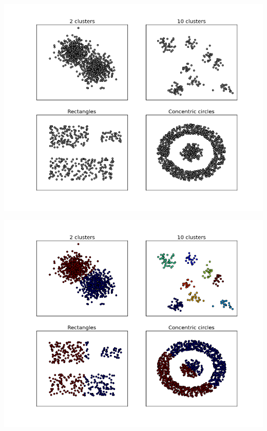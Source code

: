 \documentclass[aspectratio=169]{beamer}
\begin{document}
\begin{frame}

\begin{center}
\includegraphics[height=\textheight]{images/datasets.png}
\end{center}

\end{frame}

\begin{frame}

\begin{center}
\includegraphics[height=\textheight]{images/datasets_km.png}
\end{center}

\end{frame}
\end{document}

